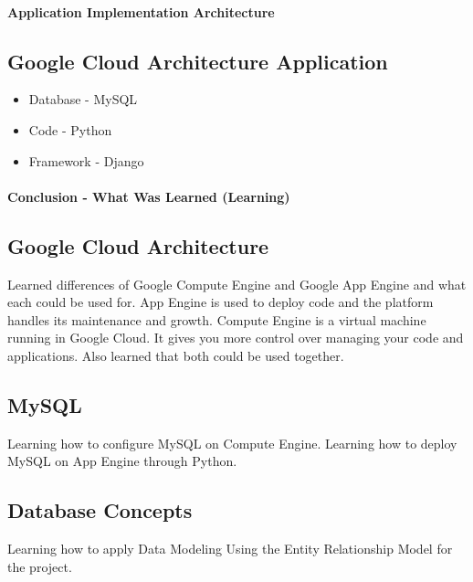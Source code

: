 \documentclass[11pt]{report}
\begin{document}
\paragraph{Application Implementation Architecture}
\subsection*{Google Cloud Architecture Application}
\begin{itemize}
    \item Database - MySQL
    \item Code - Python
    \item Framework - Django
\end{itemize}

\paragraph{Conclusion - What Was Learned (Learning)}
\subsection*{Google Cloud Architecture}
    Learned differences of Google Compute Engine and Google App Engine and what each could be used for.  App Engine is used to deploy code and the platform handles its maintenance and growth.  Compute Engine is a virtual machine running in Google Cloud. It gives you more control over managing your code and applications.  Also learned that both could be used together. 
    
 \subsection*{MySQL}   
    Learning how to configure MySQL on Compute Engine. Learning how to deploy MySQL on App Engine through Python.
    
\subsection*{Database Concepts}
Learning how to apply Data Modeling Using the Entity Relationship Model for the project.
\end{document}
